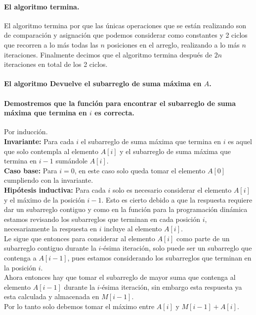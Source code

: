 \documentclass[12pt]{article}
\begin{document}
\paragraph{El algoritmo termina.} El algoritmo termina por que las únicas operaciones que se están realizando son de comparación y asignación que podemos considerar como constantes y 2 ciclos que recorren a lo más todas las $n$ posiciones en el arreglo, realizando a lo más $n$ iteraciones. Finalmente decimos que el algoritmo termina después de $2n$ iteraciones en total de los 2 ciclos.
\paragraph{El algoritmo Devuelve el subarreglo de suma máxima en $A$.} 
\paragraph{Demostremos que la función para encontrar el subarreglo de suma máxima que termina en $i$ es correcta.}
Por inducción.\\
\textbf{Invariante:} Para cada $i$ el subarreglo de suma máxima que termina en $i$ es aquel que solo contempla al elemento $A[i]$ y el subarreglo de suma máxima que termina en $i-1$ sumándole $A[i]$. \\
\textbf{Caso base:} Para $i=0$, en este caso solo queda tomar el elemento $A[0]$ cumpliendo con la invariante.\\
\textbf{Hipótesis inductiva:} Para cada $i$ solo es necesario considerar el elemento $A[i]$ y el máximo de la posición $i-1$. Esto es cierto debido a que la respuesta requiere dar un subarreglo contiguo y como en la función para la programación dinámica estamos revisando los subarreglos que terminan en cada posición $i$, necesariamente la respuesta en $i$ incluye al elemento $A[i]$.\\
Le sigue que entonces para considerar al elemento $A[i]$ como parte de un subarreglo contiguo  durante la $i$-ésima iteración, solo puede ser un subarreglo que contenga a $A[i-1]$, pues estamos considerando los subarreglos que terminan en la posición $i$.\\ Ahora entonces hay que tomar el subarreglo de mayor suma que contenga al elemento $A[i-1]$ durante la $i$-ésima iteración, sin embargo esta respuesta ya esta calculada y almacenada en $M[i-1]$.\\ Por lo tanto solo debemos tomar el máximo entre $A[i]$ y $M[i-1]+A[i]$.
\end{document}
